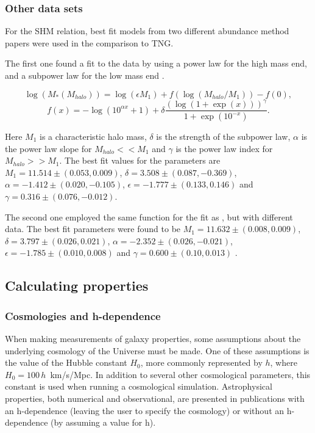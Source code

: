 \subsubsection{Other data sets}
For the SHM relation, best fit models from two different abundance method papers were used in the comparison to TNG.

The first one found a fit to the data by using a power law for the high mass end, and a subpower law for the low mass end \parencite{Behroozi2013}.

\begin{equation} \label{eq_behroozi}
    \log(M_*(M_{halo})) = \log(\epsilon M_1) + f(\log(M_{halo}/M_1)) -f(0),
\end{equation}
\begin{equation*}
    f(x) = -\log(10^{\alpha x}+1)+\delta \frac{(\log(1+\exp(x)))^\gamma}{1 +\exp(10^{-x})}.
\end{equation*}

Here $M_1$ is a characteristic halo mass, $\delta$ is the strength of the subpower law, $\alpha$ is the power law slope for $M_{halo} << M_1$ and $\gamma$ is the power law index for $M_{halo} >> M_1$. The best fit values for the parameters are $M_1 = 11.514\pm(0.053, 0.009)$, $\delta = 3.508 \pm (0.087, -0.369)$, $\alpha = -1.412 \pm (0.020, -0.105)$, $\epsilon = -1.777 \pm (0.133, 0.146)$ and $\gamma = 0.316 \pm (0.076, -0.012)$.

The second one employed the same function for the fit as \textcite{Behroozi2013}, but with different data. The best fit parameters were found to be $M_1 = 11.632\pm(0.008, 0.009)$, $\delta = 3.797 \pm (0.026, 0.021)$, $\alpha = -2.352 \pm (0.026, -0.021)$, $\epsilon = -1.785 \pm (0.010, 0.008)$  and $\gamma = 0.600 \pm (0.10, 0.013)$ \parencite{Zanisi2019}.


\subsection{Calculating properties}

\subsubsection{Cosmologies and h-dependence} \label{cosmologies}
When making measurements of galaxy properties, some assumptions about the underlying cosmology of the Universe must be made. One of these assumptions is the value of the Hubble constant $H_0$, more commonly represented by $h$, where $H_0 = 100\,h\,$ km/s/Mpc. In addition to several other cosmological parameters, this constant is used when running a cosmological simulation. Astrophysical properties, both numerical and observational, are presented in publications with an h-dependence (leaving the user to specify the cosmology) or without an h-dependence (by assuming a value for h).

